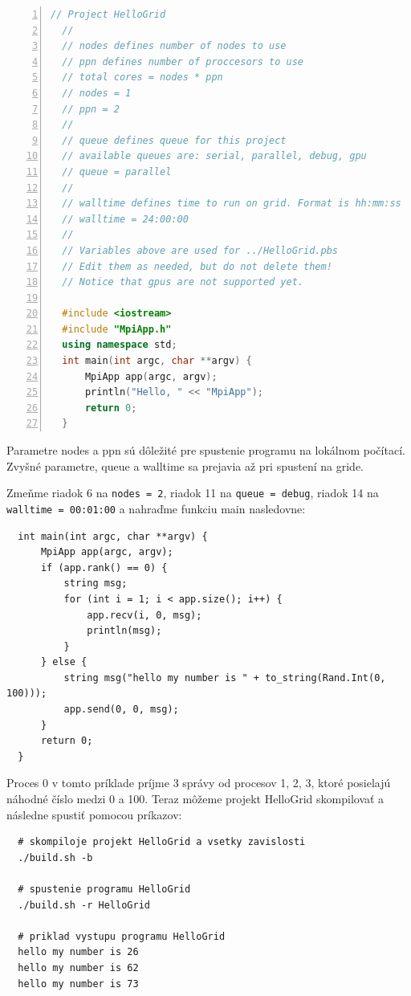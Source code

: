 \begin{lstlisting}[language=c++, caption={HelloGrid/src/main.cpp}, numbers=left]
  // Project HelloGrid
  //
  // nodes defines number of nodes to use
  // ppn defines number of proccesors to use
  // total cores = nodes * ppn
  // nodes = 1
  // ppn = 2
  //
  // queue defines queue for this project
  // available queues are: serial, parallel, debug, gpu
  // queue = parallel
  //
  // walltime defines time to run on grid. Format is hh:mm:ss
  // walltime = 24:00:00
  //
  // Variables above are used for ../HelloGrid.pbs
  // Edit them as needed, but do not delete them!
  // Notice that gpus are not supported yet.
  
  #include <iostream>
  #include "MpiApp.h"
  using namespace std;
  int main(int argc, char **argv) {
      MpiApp app(argc, argv);
      println("Hello, " << "MpiApp");
      return 0;
  }
\end{lstlisting}
Parametre nodes a ppn sú dôležité pre spustenie programu na lokálnom počítací. Zvyšné parametre, queue a walltime sa prejavia až pri spustení na gride.

Zmeňme riadok 6 na \texttt{nodes = 2}, riadok 11 na \texttt{queue = debug}, riadok 14 na \texttt{walltime = 00:01:00}
a nahraďme funkciu main nasledovne:
\begin{lstlisting}
  int main(int argc, char **argv) {
      MpiApp app(argc, argv);
      if (app.rank() == 0) {
          string msg;
          for (int i = 1; i < app.size(); i++) {
              app.recv(i, 0, msg);
              println(msg);
          }
      } else {
          string msg("hello my number is " + to_string(Rand.Int(0, 100)));
          app.send(0, 0, msg);
      }
      return 0;
  }  
\end{lstlisting}
Proces 0 v tomto príklade príjme 3 správy od procesov 1, 2, 3, ktoré posielajú náhodné číslo medzi 0 a 100.
Teraz môžeme projekt HelloGrid skompilovať a následne spustiť pomocou príkazov:
\begin{lstlisting}
  # skompiloje projekt HelloGrid a vsetky zavislosti
  ./build.sh -b

  # spustenie programu HelloGrid
  ./build.sh -r HelloGrid

  # priklad vystupu programu HelloGrid
  hello my number is 26
  hello my number is 62
  hello my number is 73
\end{lstlisting}

